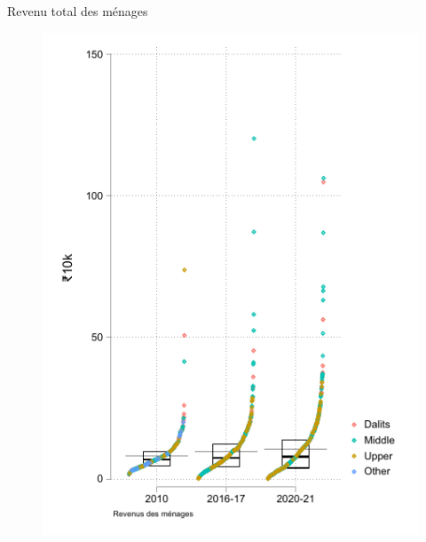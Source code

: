 \documentclass[aspectratio=169]{beamer}
\begin{document}
\begin{frame}[plain, shrink=2]{Revenu total des ménages}
\begin{figure}[htpb]
\centering
\includegraphics[scale=0.9]{INPUT/inc_hh.pdf}
\end{figure}
\end{frame}
\end{document}

